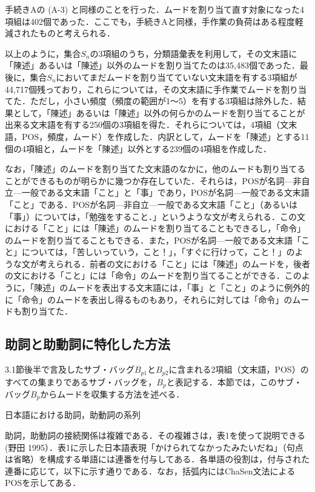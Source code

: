 \documentclass[japanese]{jnlp_1.4}
\newcommand{\InH}[1]{}
\begin{document}
\InH{(B-3)}手続きAの (A-3) 
と同様のことを行った．ムードを割り当て直す対象になった4項組は402個であった．ここでも，手続きAと同様，手作業の負荷はある程度軽減されたものと考えられる．

以上のように，集合$S_{n}$の3項組のうち，分類語彙表を利用して，その文末語に「陳述」あるいは「陳述」以外のムードを割り当てたのは35,483個であった．最後に，集合$S_{n}$においてまだムードを割り当てていない文末語を有する3項組が44,717個残っており，これらについては，その文末語に手作業でムードを割り当てた．ただし，小さい頻度（頻度の範囲が1〜5）を有する3項組は除外した．結果として，「陳述」あるいは「陳述」以外の何らかのムードを割り当てることが出来る文末語を有する250個の3項組を得た．それらについては，4項組（文末語，POS，頻度，ムード）を作成した．内訳として，ムードを「陳述」とする11個の4項組と，ムードを「陳述」以外とする239個の4項組を作成した．

なお，「陳述」のムードを割り当てた文末語のなかに，他のムードも割り当てることができるものが明らかに幾つか存在していた．それらは，POSが名詞—非自立—一般である文末語「こと」と「事」であり，POSが名詞—一般である文末語「こと」である．POSが名詞—非自立—一般である文末語「こと」（あるいは「事」）については，「勉強をすること．」というような文が考えられる．この文における「こと」には「陳述」のムードを割り当てることもできるし，「命令」のムードを割り当てることもできる．また，POSが名詞—一般である文末語「こと」については，「苦しいっていう，こと！」，「すぐに行けって，こと！」のような文が考えられる．前者の文における「こと」には「陳述」のムードを，後者の文における「こと」には「命令」のムードを割り当てることができる．このように，「陳述」のムードを表出する文末語には，「事」と「こと」のように例外的に「命令」のムードを表出し得るものもあり，それらに対しては「命令」のムードも割り当てた．


\subsection{助詞と助動詞に特化した方法}

3.1節後半で言及したサブ・バッグ$B_{p1}$と$B_{p2}$に含まれる2項組（文末語，POS）のすべての集まりであるサブ・バッグを，$B_{p}$と表記する．本節では，このサブ・バッグ$B_{p}$からムードを収集する方法を述べる．

\begin{table}[b]
\caption{日本語における助詞，助動詞の系列}

\end{table}

助詞，助動詞の接続関係は複雑である．その複雑さは，表1を使って説明できる(野田 
1995）．表1に示した日本語表現「かけられてなかったみたいだね」（句点は省略）を構成する単語には連番を付与してある．各単語の役割は，付与された連番に応じて，以下に示す通りである．なお，括弧内にはChaSen文法によるPOSを示してある．
\end{document}
